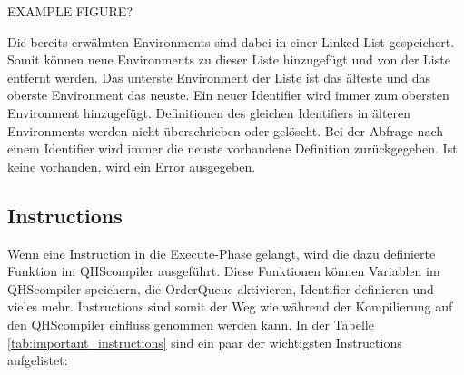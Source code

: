 EXAMPLE FIGURE?

Die bereits erwähnten Environments sind dabei in einer Linked-List gespeichert. Somit können neue Environments zu dieser Liste hinzugefügt und von der Liste entfernt werden.
Das unterste Environment der Liste ist das älteste und das oberste Environment das neuste.
Ein neuer Identifier wird immer zum obersten Environment hinzugefügt. Definitionen des gleichen Identifiers in älteren Environments werden nicht überschrieben oder gelöscht.
Bei der Abfrage nach einem Identifier wird immer die neuste vorhandene Definition zurückgegeben. Ist keine vorhanden, wird ein Error ausgegeben.

\subsection{Instructions}
Wenn eine Instruction in die Execute-Phase gelangt, wird die dazu definierte Funktion im QHScompiler ausgeführt.
Diese Funktionen können Variablen im QHScompiler speichern, die OrderQueue aktivieren, Identifier definieren und vieles mehr. Instructions sind somit der Weg wie während der Kompilierung auf den QHScompiler einfluss genommen werden kann.
In der Tabelle \ref{tab:important_instructions} sind ein paar der wichtigsten Instructions aufgelistet:

